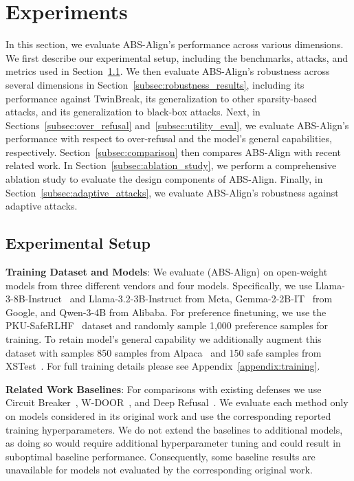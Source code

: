 \section{Experiments}
\label{sec:experiments}


In this section, we evaluate ABS-Align's performance across various dimensions. We first describe our experimental setup, including the benchmarks, attacks, and metrics used in Section~\ref{subsec:experimental_setup}. We then evaluate ABS-Align's robustness across several dimensions in Section~\ref{subsec:robustness_results}, including its performance against TwinBreak, its generalization to other sparsity-based attacks, and its generalization to black-box attacks. Next, in Sections~\ref{subsec:over_refusal} and~\ref{subsec:utility_eval}, we evaluate ABS-Align's performance with respect to over-refusal and the model's general capabilities, respectively. Section~\ref{subsec:comparison} then compares ABS-Align with recent related work. In Section~\ref{subsec:ablation_study}, we perform a comprehensive ablation study to evaluate the design components of ABS-Align. Finally, in Section~\ref{subsec:adaptive_attacks}, we evaluate ABS-Align's robustness against adaptive attacks.

\subsection{Experimental Setup}
\label{subsec:experimental_setup}


\textbf{Training Dataset and Models}: We evaluate \method (ABS-Align) on open-weight models from three different vendors and four models. Specifically, we use Llama-3-8B-Instruct~\cite{llama3modelcard, grattafiori2024llama3herdmodels} and Llama-3.2-3B-Instruct from Meta, Gemma-2-2B-IT~\cite{gemma_2024} from Google, and Qwen-3-4B from Alibaba. For preference finetuning, we use the PKU-SafeRLHF~\cite{ji2024pku} dataset and randomly sample 1,000 preference samples for training. To retain model's general capability we additionally augment this dataset with samples 850 samples from Alpaca~\cite{alpaca} and 150 safe samples from XSTest~\cite{rottger2024xstest}. For full training details please see Appendix~\ref{appendix:training}.

\textbf{Related Work Baselines}: For comparisons with existing defenses we use Circuit Breaker~\cite{zou2024circuit}, W-DOOR~\cite{zhao2025door}, and Deep Refusal~\cite{deeprefusal}. We evaluate each method only on models considered in its original work and use the corresponding reported training hyperparameters. We do not extend the baselines to additional models, as doing so would require additional hyperparameter tuning and could result in suboptimal baseline performance. Consequently, some baseline results are unavailable for models not evaluated by the corresponding original work.


